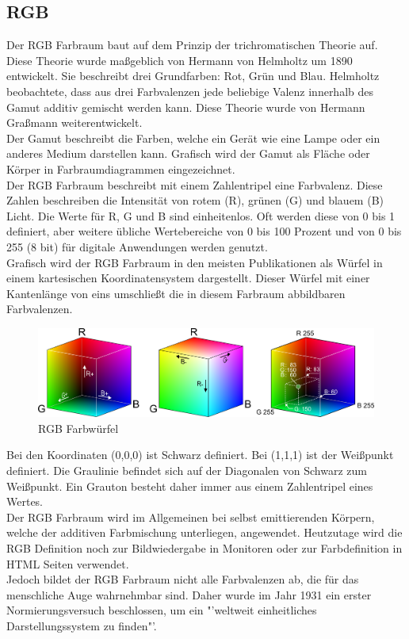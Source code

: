\documentclass[11pt]{scrartcl}
\begin{document}
\subsection{RGB}
Der RGB Farbraum baut auf dem Prinzip der trichromatischen Theorie auf. Diese Theorie wurde maßgeblich von Hermann von Helmholtz um 1890 entwickelt. Sie
beschreibt drei Grundfarben: Rot, Grün und Blau. Helmholtz beobachtete, dass aus drei Farbvalenzen jede beliebige Valenz innerhalb des Gamut
additiv gemischt werden kann. Diese Theorie wurde von Hermann Graßmann weiterentwickelt.\\
Der Gamut beschreibt die Farben, welche ein Gerät wie eine Lampe oder ein anderes Medium darstellen kann. Grafisch wird der Gamut als Fläche oder Körper in
Farbraumdiagrammen eingezeichnet.\\
Der RGB Farbraum beschreibt mit einem Zahlentripel eine Farbvalenz. Diese Zahlen beschreiben die Intensität von rotem (R), grünen (G) und
blauem (B) Licht. Die Werte für R, G und B sind einheitenlos. Oft werden diese von 0 bis 1 definiert, aber weitere übliche Wertebereiche
von 0 bis 100 Prozent und von 0 bis 255 (8 bit) für digitale Anwendungen werden genutzt. \cite{wikipediaRGB}\\
Grafisch wird der RGB Farbraum in den meisten Publikationen als Würfel in einem kartesischen Koordinatensystem dargestellt. Dieser Würfel
mit einer Kantenlänge von eins umschließt die in diesem Farbraum abbildbaren Farbvalenzen.
\begin{figure}[H]
    \includegraphics[width=\textwidth]{images/rgb_color_cube.png}
    \caption{RGB Farbwürfel \cite{wisotopRGB}}
\end{figure}
\noindent
Bei den Koordinaten (0,0,0) ist Schwarz definiert. Bei (1,1,1) ist der Weißpunkt definiert. Die Graulinie befindet sich auf der Diagonalen
von Schwarz zum Weißpunkt. Ein Grauton besteht daher immer aus einem Zahlentripel eines Wertes. \cite{wisotopRGB}\\
Der RGB Farbraum wird im Allgemeinen bei selbst emittierenden Körpern, welche der additiven Farbmischung unterliegen, angewendet. Heutzutage
wird die RGB Definition noch zur Bildwiedergabe in Monitoren oder zur Farbdefinition in HTML Seiten verwendet.\\
Jedoch bildet der RGB Farbraum nicht alle Farbvalenzen ab, die für das menschliche Auge wahrnehmbar sind. Daher wurde im Jahr 1931 ein erster
Normierungsversuch beschlossen, um ein "'weltweit einheitliches Darstellungssystem zu finden"'.\\\cite{wikipediaRGB}
\end{document}
